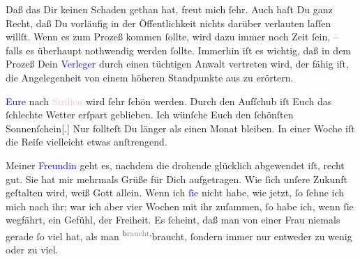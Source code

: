 \pstart
           Daß das \label{K_L03442-2v}\label{K_L03442-2h} Dir keinen Schaden gethan hat, freut mich ſehr. Auch haſt Du ganz Recht, daß
               Du vorläufig in der Öffentlichkeit nichts darüber verlauten laſſen willſt. Wenn es
               zum Prozeß kommen ſollte, wird dazu immer noch Zeit ſein, – falls es überhaupt
               nothwendig werden ſollte. Immerhin iſt es wichtig, daß in dem Prozeß Dein \textcolor{brown}{\textcolor{blue}{Verleger}{}\ledrightnote{\textcolor{blue}{Fritz Freund}}}{}\ledrightnote{{$\rightarrow$}\textcolor{brown}{Wiener Verlag}} durch einen tüchtigen Anwalt vertreten wird, der fähig {\pb}iſt, die Angelegenheit von einem
               höheren Standpunkte aus zu erörtern.\pend
           
\pstart
           \textcolor{blue}{Eure}{}\ledrightnote{{$\rightarrow$}\textcolor{blue}{Olga Schnitzler}}{ }\label{K_L03442-17v}\label{K_L03442-17h} nach \textcolor{pink}{Sizilien}{}\ledrightnote{\textcolor{pink}{Sizilien}} wird ſehr ſchön werden.
               Durch den Aufſchub iſt Euch das ſchlechte Wetter erſpart geblieben. Ich wünſche Euch
               den ſchönſten Sonnenſchein{[}.{]} Nur follteſt Du länger als einen
               Monat bleiben. In einer Woche iſt die Reiſe vielleicht etwas anſtrengend.\pend
           
\pstart
           Meiner \textcolor{blue}{Freundin}{}\ledrightnote{{$\rightarrow$}\textcolor{blue}{Theodore Rottenberg}} geht es,
               nachdem die drohende \label{K_L03442-13v}\label{K_L03442-13h}{ } glücklich abgewendet iſt, recht gut. Sie hat mir
                   mehrmals Grüße für Dich aufgetragen. Wie
               ſich unſere Zukunft geſtalten wird, weiß Gott allein. Wenn {\pb} ich \textcolor{blue}{ſie}{}\ledrightnote{{$\rightarrow$}\textcolor{blue}{Theodore Rottenberg}} nicht habe,
               wie jetzt, ſo ſehne ich mich nach ihr; war ich aber vier Wochen mit ihr zuſammen, ſo
               habe ich, wenn ſie wegfährt, ein Gefühl,  der Freiheit. Es ſcheint, daß man von einer Frau niemals gerade ſo viel hat,
               als man \substVorne{}\textsuperscript{b\textcolor{gray}{raucht},}{\allowbreak}\substDazwischen{}braucht,\substHinten{} ſondern immer nur entweder zu wenig oder zu viel.\pend
           
